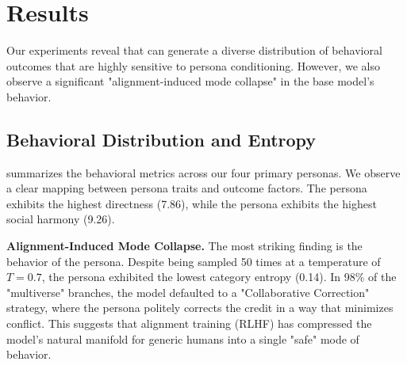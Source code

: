 \section{Results}
\label{sec:results}

Our experiments reveal that \gpt can generate a diverse distribution of behavioral outcomes that are highly sensitive to persona conditioning. However, we also observe a significant "alignment-induced mode collapse" in the base model's behavior.

\subsection{Behavioral Distribution and Entropy}
 summarizes the behavioral metrics across our four primary personas. We observe a clear mapping between persona traits and outcome factors. The \aggressive persona exhibits the highest directness (7.86), while the \passive persona exhibits the highest social harmony (9.26).

\begin{table}[t]
    \centering
    \caption{Distributional metrics across personas in the "Mistaken Credit" social dilemma. Best results in each column are highlighted. \generic shows the lowest behavioral diversity (entropy).}
    \label{tab:summary_stats}
\end{table}

{\bf Alignment-Induced Mode Collapse.} The most striking finding is the behavior of the \generic persona. Despite being sampled 50 times at a temperature of $T=0.7$, the \generic persona exhibited the lowest category entropy (0.14). In 98\% of the "multiverse" branches, the model defaulted to a "Collaborative Correction" strategy, where the persona politely corrects the credit in a way that minimizes conflict. This suggests that alignment training (RLHF) has compressed the model's natural manifold for generic humans into a single "safe" mode of behavior.

